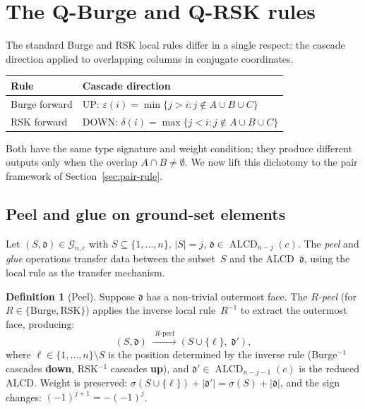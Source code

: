 \documentclass[11pt]{article}
\newcommand{\ALCD}{\operatorname{ALCD}}
\theoremstyle{plain}
\theoremstyle{definition}
\newtheorem{definition}[theorem]{Definition}
\begin{document}
\section{The Q-Burge and Q-RSK rules}
\label{sec:two-rules}

The standard Burge and RSK local rules differ in a single
respect: the cascade direction applied to overlapping columns
in conjugate coordinates.
\begin{center}
\begin{tabular}{l|l}
\textbf{Rule} & \textbf{Cascade direction} \\ \hline
Burge forward & UP:
  $\varepsilon(i) = \min\{j > i : j \notin A \cup B \cup C\}$
  \\
RSK forward & DOWN:
  $\delta(i) = \max\{j < i : j \notin A \cup B \cup C\}$
\end{tabular}
\end{center}
Both have the same type signature and weight condition; they
produce different outputs only when the overlap
$A \cap B \neq \emptyset$.  We now lift this dichotomy to the
pair framework of Section~\ref{sec:pair-rule}.


\subsection{Peel and glue on ground-set elements}

Let $(S, \mathfrak{d}) \in \mathcal{G}_{n,c}$ with
$S \subseteq \{1, \ldots, n\}$, $|S| = j$,
$\mathfrak{d} \in \ALCD_{n-j}(c)$.  The \emph{peel} and
\emph{glue} operations transfer data between the subset~$S$
and the ALCD~$\mathfrak{d}$, using the local rule as the
transfer mechanism.

\begin{definition}[Peel]
\label{def:peel}
Suppose $\mathfrak{d}$ has a non-trivial outermost face.  The
\emph{$R$-peel} (for $R \in \{\text{Burge}, \text{RSK}\}$)
applies the inverse local rule~$R^{-1}$ to extract the
outermost face, producing:
\[
  (S, \mathfrak{d})
  \;\xrightarrow{\;\text{$R$-peel}\;}
  (S \cup \{\ell\},\; \mathfrak{d}'),
\]
where $\ell \in \{1, \ldots, n\} \setminus S$ is the position
determined by the inverse rule
(Burge$^{-1}$ cascades \textbf{down}, RSK$^{-1}$ cascades
\textbf{up}), and $\mathfrak{d}' \in \ALCD_{n-j-1}(c)$ is the
reduced ALCD\@.  Weight is preserved:
$\sigma(S \cup \{\ell\}) + |\mathfrak{d}'|
= \sigma(S) + |\mathfrak{d}|$, and the sign changes:
$(-1)^{j+1} = -(-1)^j$.
\end{definition}
\end{document}
